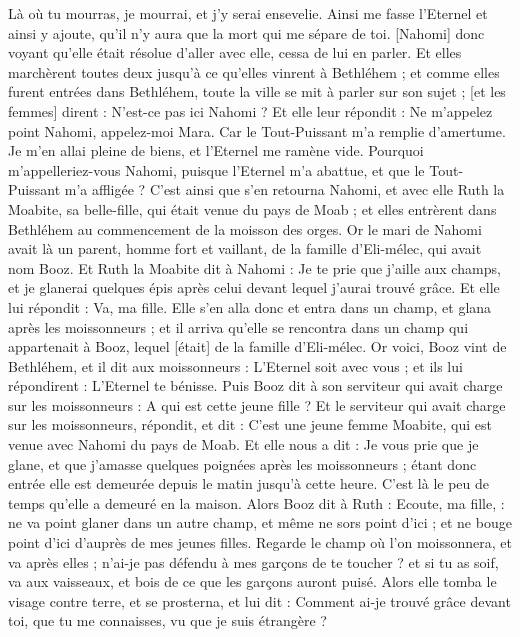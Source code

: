 \begin{multicols}{2}
Là où tu mourras, je mourrai, et j'y serai ensevelie. Ainsi me fasse l'Eternel et ainsi y ajoute, qu'il n'y aura que la mort qui me sépare de toi.
[Nahomi] donc voyant qu'elle était résolue d'aller avec elle, cessa de lui en parler.
Et elles marchèrent toutes deux jusqu'à ce qu'elles vinrent à Bethléhem ; et comme elles furent entrées dans Bethléhem, toute la ville se mit à parler sur son sujet ; [et les femmes] dirent : N'est-ce pas ici Nahomi ?
Et elle leur répondit : Ne m'appelez point Nahomi, appelez-moi Mara. Car le Tout-Puissant m'a remplie d'amertume.
Je m'en allai pleine de biens, et l'Eternel me ramène vide. Pourquoi m'appelleriez-vous Nahomi, puisque l'Eternel m'a abattue, et que le Tout-Puissant m'a affligée ?
C'est ainsi que s'en retourna Nahomi, et avec elle Ruth la Moabite, sa belle-fille, qui était venue du pays de Moab ; et elles entrèrent dans Bethléhem au commencement de la moisson des orges.
\VerseOne{}Or le mari de Nahomi avait là un parent, homme fort et vaillant, de la famille d'Eli-mélec, qui avait nom Booz.
Et Ruth la Moabite dit à Nahomi : Je te prie que j'aille aux champs, et je glanerai quelques épis après celui devant lequel j'aurai trouvé grâce. Et elle lui répondit : Va, ma fille.
Elle s'en alla donc et entra dans un champ, et glana après les moissonneurs ; et il arriva qu'elle se rencontra dans un champ qui appartenait à Booz, lequel [était] de la famille d'Eli-mélec.
Or voici, Booz vint de Bethléhem, et il dit aux moissonneurs : L'Eternel soit avec vous ; et ils lui répondirent : L'Eternel te bénisse.
Puis Booz dit à son serviteur qui avait charge sur les moissonneurs : A qui est cette jeune fille ?
Et le serviteur qui avait charge sur les moissonneurs, répondit, et dit : C'est une jeune femme Moabite, qui est venue avec Nahomi du pays de Moab.
Et elle nous a dit : Je vous prie que je glane, et que j'amasse quelques poignées après les moissonneurs ; étant donc entrée elle est demeurée depuis le matin jusqu'à cette heure. C'est là le peu de temps qu'elle a demeuré en la maison.
Alors Booz dit à Ruth : Ecoute, ma fille, : ne va point glaner dans un autre champ, et même ne sors point d'ici ; et ne bouge point d'ici d'auprès de mes jeunes filles.
Regarde le champ où l'on moissonnera, et va après elles ; n'ai-je pas défendu à mes garçons de te toucher ? et si tu as soif, va aux vaisseaux, et bois de ce que les garçons auront puisé.
Alors elle tomba le visage contre terre, et se prosterna, et lui dit : Comment ai-je trouvé grâce devant toi, que tu me connaisses, vu que je suis étrangère ?

\end{multicols}
